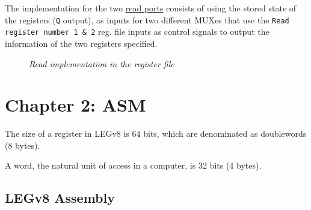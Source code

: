 \documentclass[11pt]{article}
\begin{document}
The implementation for the two \underline{read ports} consists of using the stored state of the registers (\texttt{Q} output), as inputs for two different MUXes that use the \texttt{Read register number 1 \& 2} reg. file inputs as control signals to output the information of the two registers specified.

\begin{figure}[htbp]
    \centering
    \caption{\textit{Read implementation in the register file}}
\end{figure}

\pagebreak

\section*{Chapter 2: ASM}

The size of a register in LEGv8 is 64 bits, which are denominated as doublewords (8 bytes).

A word, the natural unit of access in a computer, is 32 bits (4 bytes).

\subsection*{LEGv8 Assembly}
\end{document}
